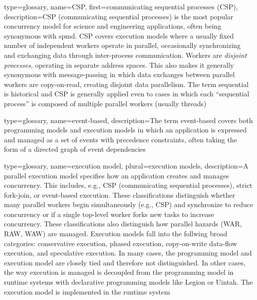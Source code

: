 {
  type=glossary,
  name={CSP},
  first={communicating sequential processes (CSP)},
  description={CSP (communicating sequential processes) is the most popular
    concurrency model for science and engineering applications, often being
      synonymous with \gls{spmd}. CSP covers execution models where a usually fixed number of independent workers operate in parallel,
      occasionally synchronizing and exchanging data through inter-process communication. Workers are \emph{disjoint processes},
      operating in separate address spaces.  This also makes it generally synonymous with message-passing in which data exchanges between parallel workers are copy-on-read, creating disjoint data parallelism.  The term sequential is historical and CSP is generally applied even to cases in which each ``sequential process'' is composed of multiple parallel workers (usually threads)}
}

{
  type=glossary,
  name={event-based},
  description={The term event-based covers both \glspl{programming model} and
    \glspl{execution model} in which an application is expressed and managed as a set of events with precedence constraints, often taking the form of a directed graph of event dependencies}
}

{
  type=glossary,
  name={execution model},
  plural={execution models},
  description={A parallel execution model specifies how an application creates
    and manages \gls{concurrency}. This includes, e.g., \gls{CSP} (communicating
        sequential processes), strict \gls{fork-join}, or \gls{event-based}
      execution.  These classifications distinguish whether many parallel
      workers begin simultaneously (e.g., \gls{CSP}) and synchronize to reduce
      \gls{concurrency}
      or if a single top-level worker forks new tasks to increase \gls{concurrency}.
      These classifications also distinguish how parallel hazards (\gls{WAR},
          \gls{RAW}, \gls{WAW}) are managed. Execution models fall into the
      follwing broad categories: \gls{conservative execution}, \gls{phased
        execution}, \gls{copy-on-write data-flow execution}, and
        \gls{speculative execution}.
    In many cases, the \gls{programming model} and execution model are closely tied and
      therefore not distinguished. In other cases, the way execution is managed is decoupled from
      the \gls{programming model} in \glspl{runtime system} with
      \gls{declarative} \glspl{programming model} like Legion or Uintah. The execution model is implemented in the
      \gls{runtime system}
  }
}

